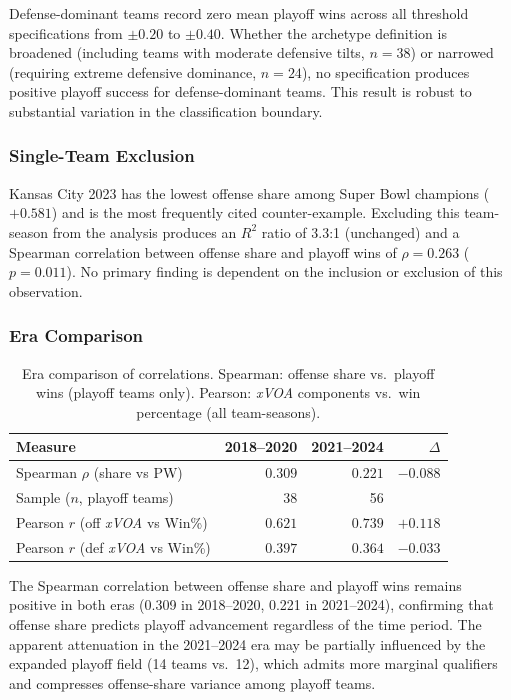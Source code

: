 \documentclass[12pt,a4paper]{article}
\newcommand{\xvoa}{\textit{xVOA}}
\begin{document}
Defense-dominant teams record zero mean playoff wins across all threshold specifications from $\pm 0.20$ to $\pm 0.40$. Whether the archetype definition is broadened (including teams with moderate defensive tilts, $n = 38$) or narrowed (requiring extreme defensive dominance, $n = 24$), no specification produces positive playoff success for defense-dominant teams. This result is robust to substantial variation in the classification boundary.

\subsubsection{Single-Team Exclusion}

Kansas City 2023 has the lowest offense share among Super Bowl champions ($+0.581$) and is the most frequently cited counter-example. Excluding this team-season from the analysis produces an $R^2$ ratio of 3.3:1 (unchanged) and a Spearman correlation between offense share and playoff wins of $\rho = 0.263$ ($p = 0.011$). No primary finding is dependent on the inclusion or exclusion of this observation.

\subsubsection{Era Comparison}

\begin{table}[htbp]
  \centering
  \caption{Era comparison of correlations. Spearman: offense share vs.\
           playoff wins (playoff teams only). Pearson: \xvoa{} components
           vs.\ win percentage (all team-seasons).}
  \label{tab:era}
  \begin{tabular}{lrrr}
    \toprule
    \textbf{Measure} & \textbf{2018--2020}
      & \textbf{2021--2024} & \textbf{$\Delta$} \\
    \midrule
    Spearman $\rho$ (share vs PW)      & $0.309$ & $0.221$ & $-0.088$ \\
    Sample ($n$, playoff teams)        & 38      & 56      & \\[4pt]
    Pearson $r$ (off \xvoa{} vs Win\%) & $0.621$ & $0.739$ & $+0.118$ \\
    Pearson $r$ (def \xvoa{} vs Win\%) & $0.397$ & $0.364$ & $-0.033$ \\
    \bottomrule
  \end{tabular}
\end{table}

The Spearman correlation between offense share and playoff wins remains positive in both eras (0.309 in 2018--2020, 0.221 in 2021--2024), confirming that offense share predicts playoff advancement regardless of the time period. The apparent attenuation in the 2021--2024 era may be partially influenced by the expanded playoff field (14 teams vs.\ 12), which admits more marginal qualifiers and compresses offense-share variance among playoff teams.
\end{document}
